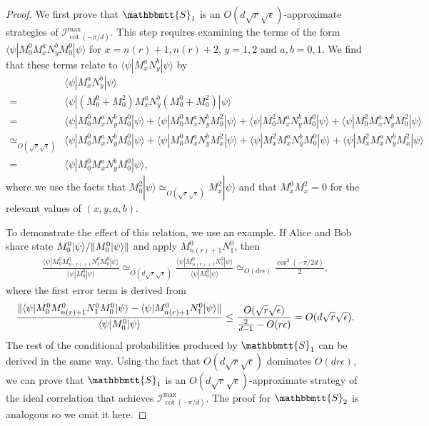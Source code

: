 \documentclass[11pt,letterpaper]{article}
\newcommand{\ket}[1]{|#1\rangle}
\newcommand{\bra}[1]{\langle#1|}
\DeclarePairedDelimiter{\norm}{\lVert}{\rVert}
\newcommand{\1}{\mathbb{1}}
\newcommand{\nr}{n(r)}
\newcommand{\bS}{\mathbbmtt{S}}
\newcommand{\I}{\mathcal{I}}
\newcommand{\ep}{\epsilon}
\newcommand{\se}{\sqrt{\epsilon}}
\newcommand{\sr}{\sqrt{r}}
\newcommand{\appd}[1]{\simeq_{#1}}
\theoremstyle{definition}
\begin{document}
\begin{proof}
We first prove that $\bS_1$ is an 
$O(d \sr \se)$-approximate strategies of $\I_{\cot(-\pi/d)}^{\max}$.
This step requires examining the terms of the form
$\bra{\psi} M_0^0 M_{x}^a N_y^b M_0^0\ket{\psi}$ for $x = \nr+1,\nr+2$, $y=1,2$ and $a,b = 0,1$.
We find that these terms relate to $\bra{\psi} M_x^a N_y^b \ket{\psi}$ by
\begin{align*}
	   &\bra{\psi} M_{x}^aN_y^b \ket{\psi} \\
	= &\bra{\psi}(M_0^0 + M_0^2) M_x^a N_y^b (M_0^0 + M_0^2)\ket{\psi} \\
	=  &\bra{\psi}M_0^0 M_x^aN_y^b M_0^0\ket{\psi} + \bra{\psi}M_0^0 M_x^aN_y^b M_0^2\ket{\psi}
	+\bra{\psi}M_0^2 M_x^aN_y^b M_0^0\ket{\psi} + \bra{\psi}M_0^2 M_x^aN_y^b M_0^2\ket{\psi}\\
	\appd{O(\sr\se)} & \bra{\psi}M_0^0 M_x^aN_y^b M_0^0\ket{\psi} + \bra{\psi}M_0^0 M_x^aN_y^b M_x^2\ket{\psi} 
	+\bra{\psi}M_x^2 M_x^aN_y^b M_0^0\ket{\psi} + \bra{\psi}M_x^2 M_x^aN_y^b M_x^2\ket{\psi}\\
	=&\bra{\psi}M_0^0 M_x^aN_y^b M_0^0\ket{\psi},
\end{align*}
where we use the facts that $M_0^2 \ket{\psi} \appd{O(\sr \se)} M_x^2 \ket{\psi}$ and that 
$M_x^0 M_x^2 = 0$ for the relevant values of $(x,y,a,b)$.

To demonstrate the effect of this relation, we use an example.
If Alice and Bob share state $M_0^0 \ket{\psi}/\norm{M_0^0 \ket{\psi}}$ and apply $M_{\nr+1}^0N_1^0$,
then
\begin{align*}
	\frac{\bra{\psi}M_0^0 M_{\nr+1}^0N_1^0 M_0^0\ket{\psi}}{\bra{\psi} M_0^0 \ket{\psi}}  
	\appd{O(d \sr \se)} \frac{\bra{\psi} M_{\nr+1}^0N_1^0 \ket{\psi}}{\bra{\psi} M_0^0 \ket{\psi}}
	\appd{O(d r \ep)}
	\frac{\cos^2(-\pi/2d)}{2},
\end{align*} 
where the first error term is derived from
\begin{align*}
	\frac{ \norm{\bra{\psi}M_0^0 M_{\nr+1}^0N_1^0 M_0^0\ket{\psi} -  \bra{\psi} M_{\nr+1}^0N_1^0 \ket{\psi}}}
	{\bra{\psi} M_0^0 \ket{\psi}} \leq \frac{O(\sr\se)}{\frac{2}{d-1} - O(r \ep)} = O(d \sr \se).
\end{align*}
The rest of the conditional probabilities produced by $\bS_1$ can be derived in the same way.
Using the fact that $O(d \sr \se)$ dominates $O(d r \ep)$,
we can prove that $\bS_1$ is an $O(d \sr\se)$-approximate strategy of the ideal correlation that achieves $\I_{\cot(-\pi/d)}^{\max}$.
The proof for $\bS_2$ is analogous so we omit it here.
\end{proof}
\end{document}
